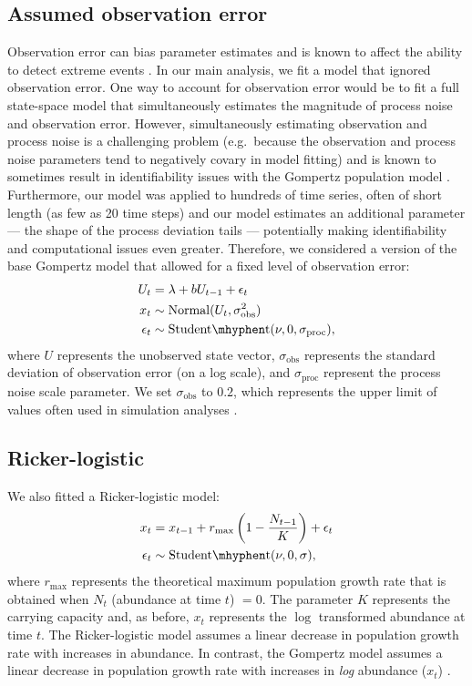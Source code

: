 \subsection{Assumed observation error}

Observation error can bias parameter estimates \citep[e.g.][]{knape2012} and is known to affect the ability to detect extreme events \citep{ward2007}. In our main analysis, we fit a model that ignored observation error. One way to account for observation error would be to fit a full state-space model that simultaneously estimates the magnitude of process noise and observation error. However, simultaneously estimating observation and process noise is a challenging problem (e.g.\ because the observation and process noise parameters tend to negatively covary in model fitting) and is known to sometimes result in identifiability issues with the Gompertz population model \citep{knape2008}. Furthermore, our model was applied to hundreds of time series, often of short length (as few as 20 time steps) and our model estimates an additional parameter --- the shape of the process deviation tails --- potentially making identifiability and computational issues even greater. Therefore, we considered a version of the base Gompertz model that allowed for a fixed level of observation error:
\begin{align*}
U_t &= \lambda + b U_{t-1} + \epsilon_t\\
x_t &\sim \mathrm{Normal}(U_t, \sigma_\mathrm{obs}^2)\\
\epsilon_t &\sim \mathrm{Student\mhyphen t}(\nu, 0, \sigma_\mathrm{proc}),
\end{align*}
where $U$ represents the unobserved state vector, $\sigma_\mathrm{obs}$ represents the standard deviation of observation error (on a log scale), and $\sigma_\mathrm{proc}$ represent the process noise scale parameter. We set $\sigma_\mathrm{obs}$ to $0.2$, which represents the upper limit of values often used in simulation analyses \citep[e.g.][]{valpine2002, thorson2014b}.

\subsection{Ricker-logistic}

We also fitted a Ricker-logistic model:
\begin{align*}
x_t &= x_{t-1} + r_{\mathrm{max}}\left(1 - \frac{N_{t-1}}{K}\right) + \epsilon_t\\
\epsilon_t &\sim \mathrm{Student\mhyphen t}(\nu, 0, \sigma),
\end{align*}
where $r_\mathrm{max}$ represents the theoretical maximum population growth rate that is obtained when $N_t$ (abundance at time $t$) $= 0$. The parameter $K$ represents the carrying capacity and, as before, $x_t$ represents the $\log$ transformed abundance at time $t$. The Ricker-logistic model assumes a linear decrease in population growth rate with increases in abundance. In contrast, the Gompertz model assumes a linear decrease in population growth rate with increases in \textit{log} abundance ($x_t$) \citep[e.g.][]{thibaut2012}.

